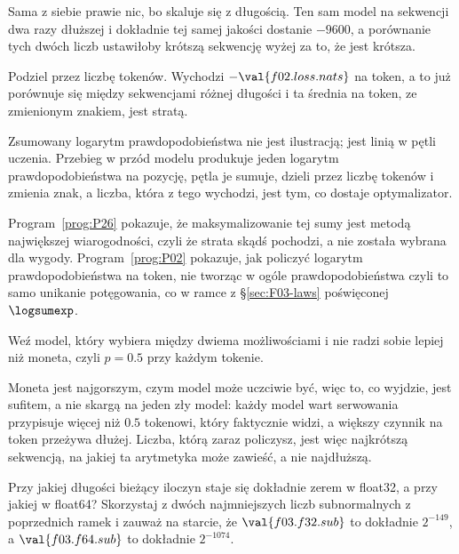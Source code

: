 \begin{fr}
\begin{ansblock}
Sama z siebie prawie nic, bo skaluje się z długością. Ten sam model na
sekwencji dwa razy dłuższej i dokładnie tej samej jakości dostanie $-9600$, a
porównanie tych dwóch liczb ustawiłoby krótszą sekwencję wyżej za to, że jest
krótsza.

Podziel przez liczbę tokenów. Wychodzi $-\val{f02.loss.nats}$ na token, a to
już porównuje się między sekwencjami różnej długości \dash{} i ta średnia na
token, ze zmienionym znakiem, jest stratą.
\end{ansblock}

\begin{aibox}
Zsumowany logarytm prawdopodobieństwa nie jest ilustracją; jest linią w pętli
uczenia. Przebieg w przód modelu produkuje jeden logarytm prawdopodobieństwa na
pozycję, pętla je sumuje, dzieli przez liczbę tokenów i zmienia znak, a liczba,
która z tego wychodzi, jest tym, co dostaje optymalizator.

Program~\ref{prog:P26} pokazuje, że maksymalizowanie tej sumy jest metodą
największej wiarogodności, czyli że strata skądś pochodzi, a nie została
wybrana dla wygody. Program~\ref{prog:P02} pokazuje, jak policzyć logarytm
prawdopodobieństwa na token, nie tworząc w ogóle prawdopodobieństwa \dash{}
czyli to samo unikanie potęgowania, co w ramce z \S\ref{sec:F03-laws}
poświęconej $\logsumexp$.
\end{aibox}
\end{fr}


\begin{fr}
\yourturn
Weź model, który wybiera między dwiema możliwościami i nie radzi sobie lepiej
niż moneta, czyli $p = \num{0.5}$ przy każdym tokenie.

Moneta jest najgorszym, czym model może uczciwie być, więc to, co wyjdzie, jest
sufitem, a nie skargą na jeden zły model: każdy model wart serwowania przypisuje
więcej niż $\num{0.5}$ tokenowi, który faktycznie widzi, a większy czynnik na
token przeżywa dłużej. Liczba, którą zaraz policzysz, jest więc najkrótszą
sekwencją, na jakiej ta arytmetyka może zawieść, a nie najdłuższą.

Przy jakiej długości bieżący iloczyn staje się dokładnie zerem w float32, a
przy jakiej w float64? Skorzystaj z dwóch najmniejszych liczb subnormalnych z
poprzednich ramek i zauważ na starcie, że $\val{f03.f32.sub}$ to dokładnie
$2^{-149}$, a $\val{f03.f64.sub}$ to dokładnie $2^{-1074}$.
\dotline
\nextframe
\end{fr}

